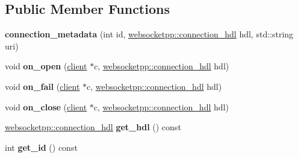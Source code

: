 \subsection*{Public Member Functions}
\begin{DoxyCompactItemize}
\item 
\mbox{\label{classconnection__metadata_ab73db2e336676ec4efa4d4dc5051958f}} 
{\bfseries connection\+\_\+metadata} (int id, \mbox{\hyperlink{namespacewebsocketpp_a6b3d26a10ee7229b84b776786332631d}{websocketpp\+::connection\+\_\+hdl}} hdl, std\+::string uri)
\item 
\mbox{\label{classconnection__metadata_ab10d997bd75d9e98b235b7e97b84b85a}} 
void {\bfseries on\+\_\+open} (\mbox{\hyperlink{classwebsocketpp_1_1client}{client}} $\ast$c, \mbox{\hyperlink{namespacewebsocketpp_a6b3d26a10ee7229b84b776786332631d}{websocketpp\+::connection\+\_\+hdl}} hdl)
\item 
\mbox{\label{classconnection__metadata_a1c2e652001b8306207beafe17b1a52ed}} 
void {\bfseries on\+\_\+fail} (\mbox{\hyperlink{classwebsocketpp_1_1client}{client}} $\ast$c, \mbox{\hyperlink{namespacewebsocketpp_a6b3d26a10ee7229b84b776786332631d}{websocketpp\+::connection\+\_\+hdl}} hdl)
\item 
\mbox{\label{classconnection__metadata_ac297cf7710d8d510ef383b7395222ce5}} 
void {\bfseries on\+\_\+close} (\mbox{\hyperlink{classwebsocketpp_1_1client}{client}} $\ast$c, \mbox{\hyperlink{namespacewebsocketpp_a6b3d26a10ee7229b84b776786332631d}{websocketpp\+::connection\+\_\+hdl}} hdl)
\item 
\mbox{\label{classconnection__metadata_a76a6a10e9192cd0ca03e2a2539cf4549}} 
\mbox{\hyperlink{namespacewebsocketpp_a6b3d26a10ee7229b84b776786332631d}{websocketpp\+::connection\+\_\+hdl}} {\bfseries get\+\_\+hdl} () const
\item 
\mbox{\label{classconnection__metadata_a3f71fbb092ec54e496464e42d960a22d}} 
int {\bfseries get\+\_\+id} () const
\item 
\mbox{\label{classconnection__metadata_aefe28a6b0b27076c685d66727e0f0a9d}} 

\end{DoxyCompactItemize}
